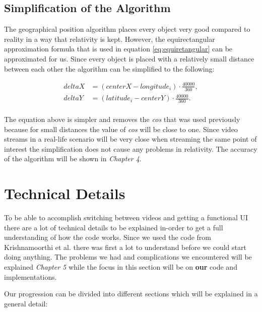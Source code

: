 \subsection{Simplification of the Algorithm}
\label{sec:limacc}

The geographical position algorithm places every object very good compared to reality in a way that relativity is kept. However, the equirectangular approximation formula that is used in equation \ref{eq:equiretangular} can be approximated for us. Since every object is placed with a relatively small distance between each other the algorithm can be simplified to the following: 

\begin{align*}
deltaX &= (centerX-longitude_i)\cdot\frac{40000}{360}, \\
deltaY &= (latitude_i-centerY)\cdot\frac{40000}{360}. \\
\end{align*}

The equation above is simpler and removes the \textit{cos} that was used previously because for small distances the value of \textit{cos} will be close to one. Since video streams in a real-life scenario will be very close when streaming the same point of interest the simplification does not cause any problems in relativity. The accuracy of the algorithm will be shown in \textit{Chapter 4}.

\section{Technical Details}
\label{sec:technicaldetails}

To be able to accomplish switching between videos and getting a functional UI there are a lot of technical details to be explained in-order to get a full understanding of how the code works. Since we used the code from Krishnamoorthi et al. \cite{qualbranch} there was first a lot to understand before we could start doing anything. The problems we had and complications we encountered will be explained \textit{Chapter 5} while the focus in this section will be on \textbf{our} code and implementations. 

Our progression can be divided into different sections which will be explained in a general detail:

